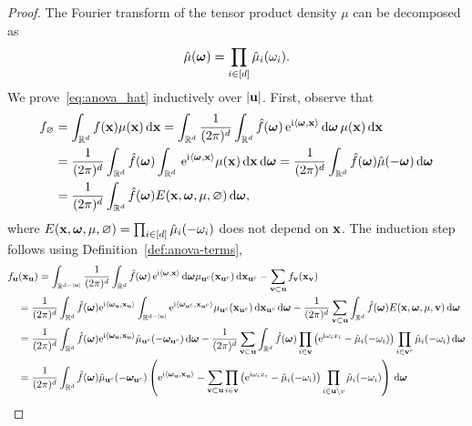 \documentclass[10pt,a4paper]{amsart}
\newcommand{\R}{\ensuremath{\mathbb{R}}}
\renewcommand{\d}{\, \mathrm{d}}
\newcommand{\e}{\mathrm{e}}
\newcommand{\im}{\mathrm{i}}
\renewcommand{\vec}[1]{\ensuremath \mathbf{\boldsymbol{#1}}}
\newcommand{\w}{\ensuremath{\vec \omega}}
\newcommand{\x}{\ensuremath{\vec x}}
\begin{document}
\begin{proof}
The Fourier transform of the tensor product density $\mu$ can be decomposed as 
\begin{equation*}
\hat{\mu} (\w) = \prod_{i\in [d]} \hat{\mu}_i(\omega_i).
\end{equation*} 
We prove~\eqref{eq:anova_hat} inductively over $|\vec u|$. First, observe that
\begin{align*}
f_\varnothing &= \int_{\R^d} f(\vec x) \mu(\x) \d \vec x 
= \int_{\R^d}\frac{1}{(2\pi)^d}\int_{\R^d}\hat f(\w)\, \e^{\im \langle \w,\vec x\rangle} \d \w\,\mu(\x) \d \vec x\\
&=\frac{1}{(2\pi)^d}\int_{\R^d}\hat f(\w)\int_{\R^d}\, \e^{\im \langle \w,\vec x\rangle} \mu(\x) \d \x\d \w 
=\frac{1}{(2\pi)^d}\int_{\R^d}\hat f(\w) \hat{\mu}(-\w)\d \w \\
&= \frac{1}{(2\pi)^d}\int_{\R^d}\hat f(\w) E(\x,\w,\mu, \varnothing)\d \w,
\end{align*}
where $E(\x,\w,\mu, \varnothing) = \prod_{i\in [d]} \hat{\mu}_i(-\omega_i)$ does not depend on $\x$.
The induction step follows using Definition~\ref{def:anova-terms},
\begin{align*}
&f_{\vec u}(\vec x_{\vec u})
=\int_{\R^{d-|\vec u|}}\frac{1}{(2\pi)^d}\int_{\R^d}\hat f(\w)\, \e^{\im \langle \w,\vec x\rangle} \d \w \mu_{\vec u^c}(\vec x_{\vec u^c})\d \vec x_{\vec u^c}-\sum_{\vec v\subset \vec u}f_{\vec v}(\vec x_{\vec v})\\
&\quad=\frac{1}{(2\pi)^d}\int_{\R^d}\hat f(\w)\e^{\im \langle \w_{\vec u},\vec x_{\vec u}\rangle}\int_{\R^{d-|\vec u|}}\e^{\im \langle \w_{\vec u^c},\vec x_{\vec u^c}\rangle}  \mu_{\vec u^c}(\vec x_{\vec u^c})\d \vec x_{\vec u^c}\d \w
-\frac{1}{(2\pi)^d}\sum_{\vec v\subset \vec u}\int_{\R^d} \hat f(\w)E(\x,\w,\mu, \vec v)\d \w\\
&\quad=\frac{1}{(2\pi)^d}\int_{\R^d}\hat f(\w)\e^{\im \langle \w_{\vec u},\vec x_{\vec u}\rangle} \hat{\mu}_{\vec u^c}(-\w_{\vec u^c})\d \w-\frac{1}{(2\pi)^d}\sum_{\vec v\subset \vec u}\int_{\R^d} \hat f(\w) \prod_{i\in \vec v} \left(\e^{\im \omega_i x_i}- \hat{\mu}_i(-\omega_i)\right) \prod_{i \in \vec v^c} \hat{\mu}_i(-\omega_i) \d \w\\
&\quad=\frac{1}{(2\pi)^d}\int_{\R^d}\hat f(\w)\hat{\mu}_{\vec u^c}(-\w_{\vec u^c}) \left(\e^{\im \langle \w_{\vec u},\vec x_{\vec u}\rangle}-\sum_{\vec v\subset \vec u} \prod_{i\in \vec v} \left(\e^{\im \omega_i x_i}- \hat{\mu}_i(-\omega_i)\right) \prod_{i \in \vec u\backslash v} \hat{\mu}_i(-\omega_i)\right) \d \w\\

\end{align*}
\end{proof}
\end{document}
